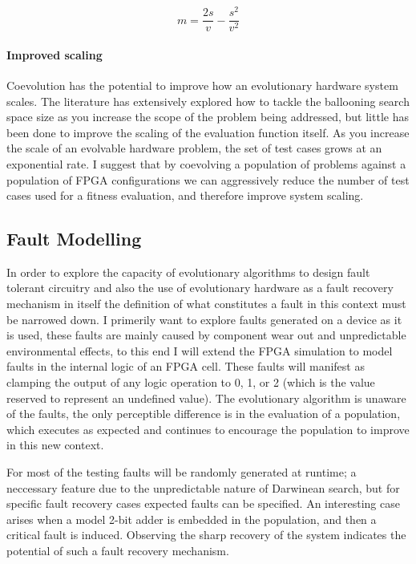 \begin{equation}
	\label{equ:vir}
	m = \frac{2s}{v} - \frac{s^2}{v^2}
\end{equation}

\paragraph{Improved scaling}
Coevolution has the potential to improve how an evolutionary hardware system scales.
The literature has extensively explored how to tackle the ballooning search space size
as you increase the scope of the problem being addressed, but little has been done
to improve the scaling of the evaluation function itself. As you increase the scale
of an evolvable hardware problem, the set of test cases grows at an exponential rate.
I suggest that by coevolving a population of problems against a population of FPGA
configurations we can aggressively reduce the number of test cases used for a fitness
evaluation, and therefore improve system scaling.

\subsection{Fault Modelling}
In order to explore the capacity of evolutionary algorithms to design fault
tolerant circuitry and also the use of evolutionary hardware as a fault
recovery mechanism in itself the definition of what constitutes a fault in
this context must be narrowed down. I primerily want to explore faults
generated on a device as it is used, these faults are mainly caused by
component wear out and unpredictable environmental effects, to
this end I will extend the FPGA simulation to model
faults in the internal logic of an FPGA cell. These faults will manifest as clamping
the output of any logic operation to 0, 1, or 2 (which is the value reserved to represent
an undefined value). The evolutionary algorithm is unaware of the
faults, the only perceptible difference is in the evaluation of a population,
which executes as expected and continues to encourage the population to improve in this
new context.

For most of the testing faults will be randomly generated at runtime; a neccessary
feature due to the unpredictable nature of Darwinean search, but for specific
fault recovery cases expected faults can be specified. An interesting case arises when
a model 2-bit adder is embedded in the population, and then a critical fault is
induced. Observing the sharp recovery of the system indicates the potential of
such a fault recovery mechanism.

